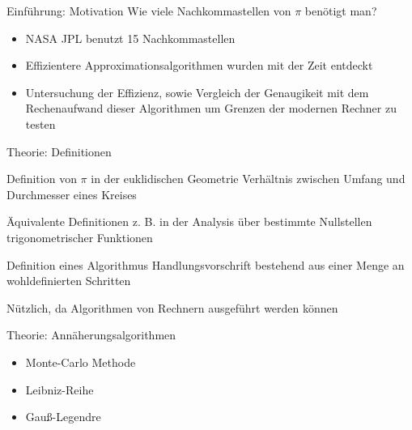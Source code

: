 \documentclass{beamer}
\begin{document}
\begin{frame}{Einführung: Motivation}
Wie viele Nachkommastellen von \(\pi\) benötigt man?
    \begin{itemize}
        \item<2-> NASA JPL benutzt 15 Nachkommastellen \cite{NASA}                                                                                         
    \end{itemize}
 \begin{itemize}
    \item<4-> Effizientere Approximationsalgorithmen wurden mit der Zeit entdeckt
    \item<5-> Untersuchung der Effizienz, sowie Vergleich der Genaugikeit mit dem Rechenaufwand dieser Algorithmen 
              um Grenzen der modernen Rechner zu testen
\end{itemize}
\end{frame}



\begin{frame}{Theorie: Definitionen}
    \begin{block}{Definition von \(\pi\) in der euklidischen Geometrie}
        Verhältnis zwischen Umfang und Durchmesser eines Kreises
    \end{block}
    Äquivalente Definitionen z. B. in der Analysis über bestimmte Nullstellen trigonometrischer Funktionen                                            %
    \\[10pt]
 {
    \begin{block}{Definition eines Algorithmus}
        Handlungsvorschrift bestehend aus einer Menge an wohldefinierten Schritten                                                                                             %
    \end{block}
     Nützlich, da Algorithmen von Rechnern ausgeführt werden können}
\end{frame}


\begin{frame}{Theorie: Annäherungsalgorithmen}
    \begin{itemize}
        \item Monte-Carlo Methode
        \item Leibniz-Reihe
        \item Gauß-Legendre
    \end{itemize}
\end{frame}
\end{document}
